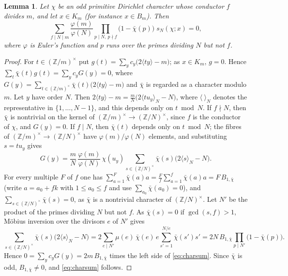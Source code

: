 \documentclass[11pt]{amsart}
\newtheorem{lemma}[theorem]{Lemma}
\theoremstyle{definition}
\theoremstyle{remark}
\numberwithin{equation}{section}
\newcommand{\Z}{\mathbb{Z}}
\begin{document}
\begin{lemma}\label{lem:charsum}
Let $\chi$ be an odd primitive Dirichlet character whose conductor $f$ divides $m$, and let $x\in K_m$ (for instance $x\in B_m$). Then
\begin{equation}\label{eq:charsum}
\sum_{f\mid N\mid m}\frac{\varphi(m)}{\varphi(N)}\prod_{p\mid N,\ p\nmid f}\bigl(1-\bar\chi(p)\bigr)\;s_N(\chi;x)=0,
\end{equation}
where $\varphi$ is Euler's function and $p$ runs over the primes dividing $N$ but not $f$.
\end{lemma}

\begin{proof}
For $t\in(\Z/m)^\times$ put $g(t)=\sum_yc_y\bigl(2\langle ty\rangle-m\bigr)$; as $x\in K_m$, $g=0$. Hence $\sum_t\bar\chi(t)g(t)=\sum_yc_yG(y)=0$, where $G(y)=\sum_{t\in(\Z/m)^\times}\bar\chi(t)\bigl(2\langle ty\rangle-m\bigr)$ and $\bar\chi$ is regarded as a character modulo $m$. Let $y$ have order $N$. Then $2\langle ty\rangle-m=\frac mN\bigl(2\langle tu_y\rangle_N-N\bigr)$, where $\langle\ \rangle_N$ denotes the representative in $\{1,\dots,N-1\}$, and this depends only on $t\bmod N$. If $f\nmid N$, then $\bar\chi$ is nontrivial on the kernel of $(\Z/m)^\times\to(\Z/N)^\times$, since $f$ is the conductor of $\chi$, and $G(y)=0$. If $f\mid N$, then $\bar\chi(t)$ depends only on $t\bmod N$; the fibres of $(\Z/m)^\times\to(\Z/N)^\times$ have $\varphi(m)/\varphi(N)$ elements, and substituting $s=tu_y$ gives
\[
G(y)=\frac mN\,\frac{\varphi(m)}{\varphi(N)}\,\chi(u_y)\sum_{s\in(\Z/N)^\times}\bar\chi(s)\bigl(2\langle s\rangle_N-N\bigr).
\]
For every multiple $F$ of $f$ one has $\sum_{a=1}^F\bar\chi(a)a=\frac Ff\sum_{a=1}^f\bar\chi(a)a=F\,B_{1,\bar\chi}$ (write $a=a_0+fk$ with $1\le a_0\le f$ and use $\sum_{a_0}\bar\chi(a_0)=0$), and $\sum_{s\in(\Z/N)^\times}\bar\chi(s)=0$, as $\bar\chi$ is a nontrivial character of $(\Z/N)^\times$. Let $N'$ be the product of the primes dividing $N$ but not $f$. As $\bar\chi(s)=0$ if $\gcd(s,f)>1$, M\"obius inversion over the divisors $e$ of $N'$ gives
\[
\sum_{s\in(\Z/N)^\times}\bar\chi(s)\bigl(2\langle s\rangle_N-N\bigr)=2\sum_{e\mid N'}\mu(e)\,\bar\chi(e)\,e\sum_{s'=1}^{N/e}\bar\chi(s')s'=2N\,B_{1,\bar\chi}\prod_{p\mid N'}\bigl(1-\bar\chi(p)\bigr).
\]
Hence $0=\sum_yc_yG(y)=2m\,B_{1,\bar\chi}$ times the left side of \eqref{eq:charsum}. Since $\bar\chi$ is odd, $B_{1,\bar\chi}\ne0$, and \eqref{eq:charsum} follows.
\end{proof}
\end{document}
